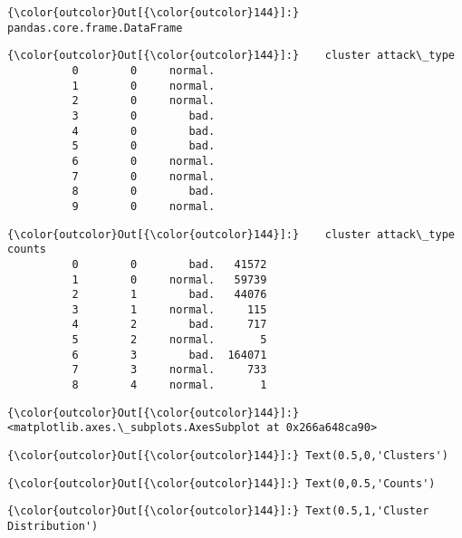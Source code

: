 \documentclass[11pt]{article}
\begin{document}
\begin{Verbatim}[commandchars=\\\{\}]
{\color{outcolor}Out[{\color{outcolor}144}]:} pandas.core.frame.DataFrame
\end{Verbatim}
            
\begin{Verbatim}[commandchars=\\\{\}]
{\color{outcolor}Out[{\color{outcolor}144}]:}    cluster attack\_type
          0        0     normal.
          1        0     normal.
          2        0     normal.
          3        0        bad.
          4        0        bad.
          5        0        bad.
          6        0     normal.
          7        0     normal.
          8        0        bad.
          9        0     normal.
\end{Verbatim}
            
\begin{Verbatim}[commandchars=\\\{\}]
{\color{outcolor}Out[{\color{outcolor}144}]:}    cluster attack\_type  counts
          0        0        bad.   41572
          1        0     normal.   59739
          2        1        bad.   44076
          3        1     normal.     115
          4        2        bad.     717
          5        2     normal.       5
          6        3        bad.  164071
          7        3     normal.     733
          8        4     normal.       1
\end{Verbatim}
            
\begin{Verbatim}[commandchars=\\\{\}]
{\color{outcolor}Out[{\color{outcolor}144}]:} <matplotlib.axes.\_subplots.AxesSubplot at 0x266a648ca90>
\end{Verbatim}
            
\begin{Verbatim}[commandchars=\\\{\}]
{\color{outcolor}Out[{\color{outcolor}144}]:} Text(0.5,0,'Clusters')
\end{Verbatim}
            
\begin{Verbatim}[commandchars=\\\{\}]
{\color{outcolor}Out[{\color{outcolor}144}]:} Text(0,0.5,'Counts')
\end{Verbatim}
            
\begin{Verbatim}[commandchars=\\\{\}]
{\color{outcolor}Out[{\color{outcolor}144}]:} Text(0.5,1,'Cluster Distribution')
\end{Verbatim}
            
\end{document}

